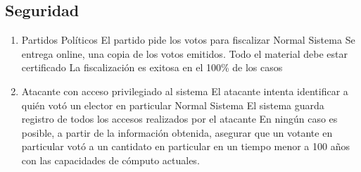 \subsection{Seguridad}

\begin{enumerate}
 \item {}
{Partidos Políticos}
{El partido pide los votos para fiscalizar}
{Normal}
{Sistema}
{Se entrega online, una copia  de los votos emitidos. Todo el material debe estar certificado}
{La fiscalización es exitosa en el 100\% de los casos}
\medskip

\item {}
{Atacante con acceso privilegiado al sistema}
{El atacante intenta identificar a quién votó un elector en particular}
{Normal}
{Sistema}
{El sistema guarda registro de todos los accesos realizados por el atacante}
{En ningún caso es posible, a partir de la información obtenida, asegurar que un votante en particular votó a un cantidato en particular en un tiempo menor a 100 años con las capacidades de cómputo actuales.}

\end{enumerate}


